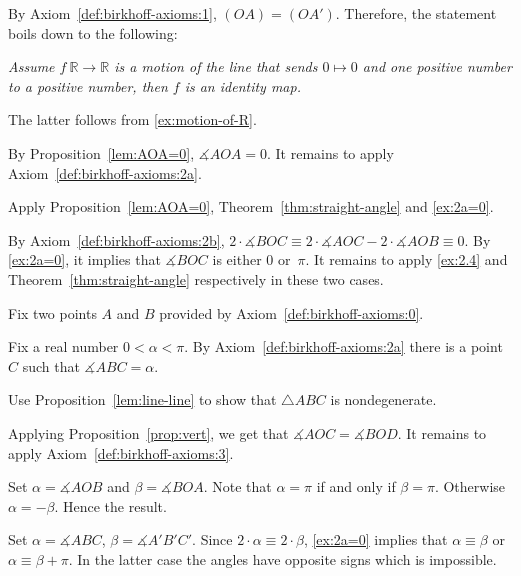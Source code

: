 \parbf{\ref{ex:[OA)=[OA')}.}
By Axiom~\ref{def:birkhoff-axioms:1},
$(OA)=(OA')$.
Therefore, the statement boils down to the following:

\textit{Assume $f\:\mathbb{R}\to \mathbb{R}$ is a motion of the line that sends $0\mapsto 0$ and one positive number to a positive number, then $f$ is an identity map.}

The latter follows from \ref{ex:motion-of-R}.

By Proposition~\ref{lem:AOA=0},
$\measuredangle AOA=0$.
It remains to apply Axiom~\ref{def:birkhoff-axioms:2a}.

Apply Proposition~\ref{lem:AOA=0},
Theorem~\ref{thm:straight-angle} 
and \ref{ex:2a=0}.

By Axiom~\ref{def:birkhoff-axioms:2b},
$2\cdot\measuredangle BOC
\equiv 
2\cdot\measuredangle AOC-2\cdot \measuredangle AOB
\equiv 0$.
By \ref{ex:2a=0}, 
it implies that 
$\measuredangle BOC$ is either $0$ or~$\pi$.
It remains to apply \ref{ex:2.4} and Theorem~\ref{thm:straight-angle} respectively in these two cases.

Fix two points $A$ and $B$ provided by Axiom~\ref{def:birkhoff-axioms:0}.

Fix a real number $0<\alpha<\pi$.
By Axiom~\ref{def:birkhoff-axioms:2a} there is a point $C$ such that $\measuredangle ABC=\alpha$.

Use Proposition~\ref{lem:line-line} to show that $\triangle ABC$ is nondegenerate.

Applying Proposition~\ref{prop:vert}, we get that
$\measuredangle AOC= \measuredangle BOD$.
It remains to apply Axiom~\ref{def:birkhoff-axioms:3}.

\setcounter{eqtn}{0}

Set $\alpha=\measuredangle AOB$ 
and 
$\beta=\measuredangle BOA$.
Note that $\alpha=\pi$ if and only if $\beta=\pi$.
Otherwise $\alpha=-\beta$.
Hence the result.

Set $\alpha=\measuredangle ABC$, $\beta=\measuredangle A'B'C'$.
Since $2\cdot\alpha\equiv 2\cdot \beta$, \ref{ex:2a=0} implies that
 $\alpha\equiv \beta$ or $\alpha\equiv \beta+\pi$.
In the latter case the angles have opposite signs which is impossible.


